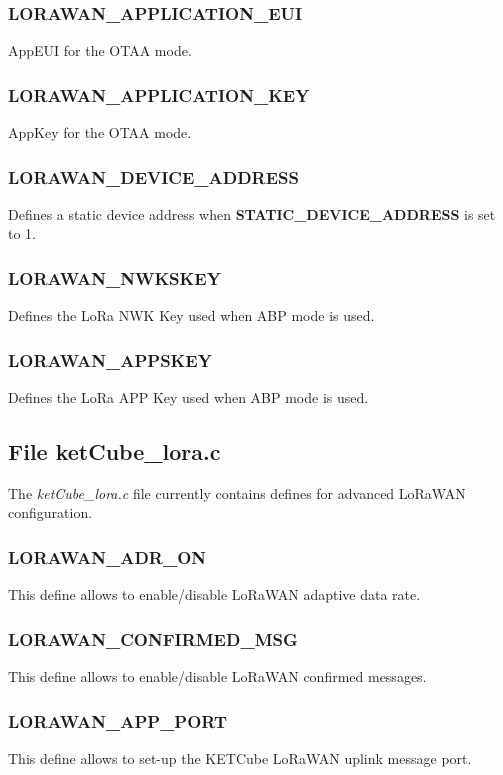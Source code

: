 \subsubsection{LORAWAN\_APPLICATION\_EUI}
AppEUI for the OTAA mode.

\subsubsection{LORAWAN\_APPLICATION\_KEY} 
AppKey for the OTAA mode.

\subsubsection{LORAWAN\_DEVICE\_ADDRESS} 
Defines a static device address when {\bf STATIC\_DEVICE\_ADDRESS} is set to 1.

\subsubsection{LORAWAN\_NWKSKEY}
Defines the LoRa NWK Key used when ABP mode is used.

\subsubsection{LORAWAN\_APPSKEY} 
Defines the LoRa APP Key used when ABP mode is used.

\subsection{File ketCube\_lora.c}
The {\it ketCube\_lora.c} file currently contains defines for advanced LoRaWAN configuration.

\subsubsection{LORAWAN\_ADR\_ON}
This define allows to enable/disable LoRaWAN adaptive data rate.

\subsubsection{LORAWAN\_CONFIRMED\_MSG}
This define allows to enable/disable LoRaWAN confirmed messages.

\subsubsection{LORAWAN\_APP\_PORT}
This define allows to set-up the KETCube LoRaWAN uplink message port.

